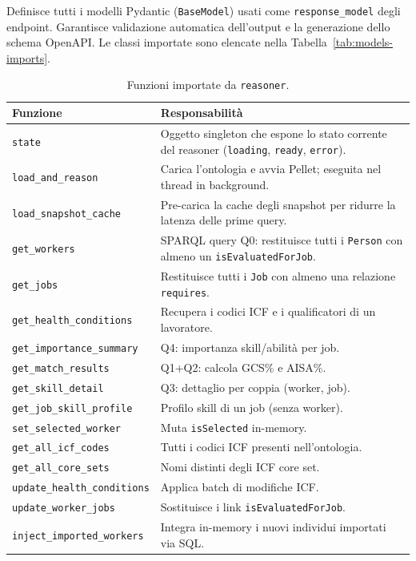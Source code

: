 \documentclass[a4paper,12pt]{article}
\renewcommand{\paragraph}[1]{%
  \par\vspace{4pt}%
  \noindent{\bfseries #1}\par\vspace{2pt}%
  \noindent\ignorespaces
}
\begin{document}
\paragraph{\texttt{models}} Definisce tutti i modelli Pydantic
(\texttt{BaseModel}) usati come \texttt{response\_model} degli endpoint.
Garantisce validazione automatica dell'output e la generazione dello
schema OpenAPI. Le classi importate sono elencate nella
Tabella~\ref{tab:models-imports}.

\begin{table}[H]
\centering
\caption{Funzioni importate da \texttt{reasoner}.}
\label{tab:reasoner-imports}
\begin{tabular}{L{5cm} L{8cm}}
\toprule
\textbf{Funzione} & \textbf{Responsabilit\`{a}} \\
\midrule
\texttt{state} & Oggetto singleton che espone lo stato corrente del
                 reasoner (\texttt{loading}, \texttt{ready}, \texttt{error}). \\
\texttt{load\_and\_reason} & Carica l'ontologia e avvia Pellet; eseguita
                             nel thread in background. \\
\texttt{load\_snapshot\_cache} & Pre-carica la cache degli snapshot
                                 per ridurre la latenza delle prime query. \\
\texttt{get\_workers} & SPARQL query Q0: restituisce tutti i \texttt{Person}
                        con almeno un \texttt{isEvaluatedForJob}. \\
\texttt{get\_jobs} & Restituisce tutti i \texttt{Job} con almeno una
                     relazione \texttt{requires}. \\
\texttt{get\_health\_conditions} & Recupera i codici ICF e i qualificatori
                                   di un lavoratore. \\
\texttt{get\_importance\_summary} & Q4: importanza skill/abilit\`{a} per job. \\
\texttt{get\_match\_results} & Q1+Q2: calcola GCS\% e AISA\%. \\
\texttt{get\_skill\_detail} & Q3: dettaglio per coppia (worker, job). \\
\texttt{get\_job\_skill\_profile} & Profilo skill di un job (senza worker). \\
\texttt{set\_selected\_worker} & Muta \texttt{isSelected} in-memory. \\
\texttt{get\_all\_icf\_codes} & Tutti i codici ICF presenti nell'ontologia. \\
\texttt{get\_all\_core\_sets} & Nomi distinti degli ICF core set. \\
\texttt{update\_health\_\allowbreak{}conditions} & Applica batch di modifiche ICF. \\
\texttt{update\_worker\_jobs} & Sostituisce i link \texttt{isEvaluatedForJob}. \\
\texttt{inject\_imported\_workers} & Integra in-memory i nuovi individui
                                     importati via SQL. \\
\bottomrule
\end{tabular}
\end{table}
\end{document}
